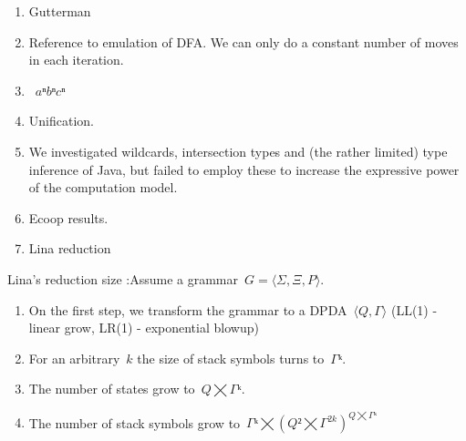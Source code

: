 
\begin{enumerate}
  \item Gutterman
  \item Reference to emulation of DFA\@. We can only do
        a constant number of moves in each iteration.
  \item~$aⁿbⁿcⁿ$
  \item \Prolog Unification.
  \item We investigated wildcards, intersection types and
        (the rather limited) type inference of 
        Java, but failed to employ these to increase the expressive power of the computation model.
  \item Ecoop results.
  \item Lina reduction
\end{enumerate}

Lina's reduction size :Assume a grammar~$G=⟨Σ,Ξ,P⟩$.
    \begin{enumerate}
      \item On the first step, we transform the grammar to a DPDA~$⟨Q,Γ⟩$ (LL(1) - linear grow, LR(1) - exponential blowup)
      \item For an arbitrary~$k$ the size of stack symbols turns to~$Γᵏ$.
      \item The number of states grow to~$Q⨉Γᵏ$.
      \item The number of stack symbols grow to~$Γᵏ⨉(Q²⨉Γ^{2k})^{Q⨉Γᵏ}$
    \end{enumerate}



\endinput



On a first sight, the proof of \cref{theorem:Gil-Levy} could follow the techniques
  sketched in \cref{section:toolkit} to type encode a DPDA (\cref{definition:DPDA}).
The partial transition function~$δ$ may be type encoded as in \cref{figure:simple-binary},
and the stack data structure of a DPDA can be encoded as in \cref{figure:stack-encoding}.

The techniques however fail with~$ε$-transitions,
  which allow the automaton to move between an unbounded number of
  configurations and maneuver the stack in a non-trivial manner,
  without making any progress on the input.
The fault in the scheme lies with compile time computation being carried out
  by the~$\Function java(σ)()$ functions, each converting
  their receiver type to the type of the receiver of the next call in the chain.
We are not aware of a \Java type encoding which makes
  it possible to convert an input type into an output type, where
  the output is computed from the input by an unbounded number of steps.
  †{With the presumption that the \Java compiler halts for all inputs (a presumption that does
    not hold for e.g., \CC, and was never proved for \Java), the claim that there is no \Java 
    type encoding for all DPDAs can be proved:
    Employing~$ε$-transitions, it is easy to construct an automaton~$A^∞$ that
    never halts on any input.
    A type encoding of~$A^∞$ creates programs that send the compiler in an infinite loop.
  }

